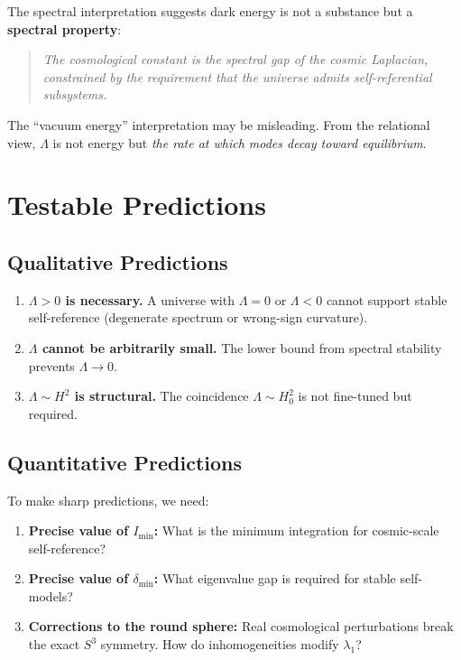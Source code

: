 \documentclass[11pt,a4paper]{article}
\theoremstyle{plain}
\theoremstyle{definition}
\theoremstyle{remark}
\begin{document}
The spectral interpretation suggests dark energy is not a substance but a \textbf{spectral property}:

\begin{quote}
\emph{The cosmological constant is the spectral gap of the cosmic Laplacian, constrained by the requirement that the universe admits self-referential subsystems.}
\end{quote}

The ``vacuum energy'' interpretation may be misleading. From the relational view, $\Lambda$ is not energy but \emph{the rate at which modes decay toward equilibrium}.

\section{Testable Predictions}

\subsection{Qualitative Predictions}

\begin{enumerate}
    \item \textbf{$\Lambda > 0$ is necessary.} A universe with $\Lambda = 0$ or $\Lambda < 0$ cannot support stable self-reference (degenerate spectrum or wrong-sign curvature).

    \item \textbf{$\Lambda$ cannot be arbitrarily small.} The lower bound from spectral stability prevents $\Lambda \to 0$.

    \item \textbf{$\Lambda \sim H^2$ is structural.} The coincidence $\Lambda \sim H_0^2$ is not fine-tuned but required.
\end{enumerate}

\subsection{Quantitative Predictions}

To make sharp predictions, we need:

\begin{enumerate}
    \item \textbf{Precise value of $I_{\min}$:} What is the minimum integration for cosmic-scale self-reference?

    \item \textbf{Precise value of $\delta_{\min}$:} What eigenvalue gap is required for stable self-models?

    \item \textbf{Corrections to the round sphere:} Real cosmological perturbations break the exact $S^3$ symmetry. How do inhomogeneities modify $\lambda_1$?
\end{enumerate}
\end{document}
